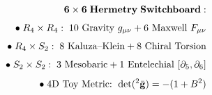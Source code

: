 \documentclass[preview]{standalone}
\begin{document}
\begin{align*}
\special{dvisvgm:raw <g id='unique000'>}\mathbf{6\times 6\;Hermetry\;Switchboard:}\\[4pt]\bullet\;R_4\times R_4:\;10\text{ Gravity }g_{\mu\nu} + 6\text{ Maxwell }F_{\mu\nu}\\[4pt]\bullet\;R_4\times S_2:\;8\text{ Kaluza--Klein} + 8\text{ Chiral Torsion}\\[4pt]\bullet\;S_2\times S_2:\;3\text{ Mesobaric} + 1\text{ Entelechial }[\partial_5,\partial_6]\\[4pt]\bullet\;\text{4D Toy Metric: }\det({}^2\bar{\mathbf{g}}) = -(1 + B^2)\special{dvisvgm:raw </g>}
\end{align*}
\end{document}

